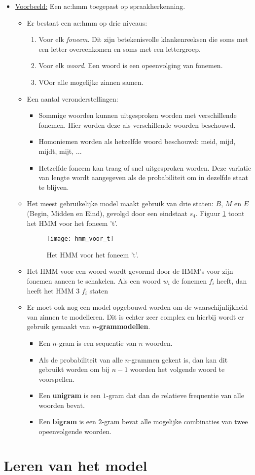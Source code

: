 \begin{itemize}
	\item \underline{Voorbeeld:} Een \gls{ac:hmm} toegepast op spraakherkenning.
	\begin{itemize}
		\item Er bestaat een \gls{ac:hmm} op drie niveaus:
		\begin{enumerate}
			\item Voor elk \textit{foneem}. Dit zijn betekenisvolle klankenreeksen die soms met een letter overeenkomen en soms met een lettergroep.
			\item Voor elk \textit{woord}. Een woord is een opeenvolging van fonemen. 
			\item VOor alle mogelijke zinnen samen.
		\end{enumerate}
		\item Een aantal veronderstellingen:
		\begin{itemize}
			\item Sommige woorden kunnen uitgesproken worden met verschillende fonemen. Hier worden deze als verschillende woorden beschouwd.
			\item Homoniemen worden als hetzelfde woord beschouwd: meid, mijd, mijdt, mijt, ...
			\item Hetzelfde foneem kan traag of snel uitgesproken worden. Deze variatie van lengte wordt aangegeven als de probabiliteit om in dezelfde staat te blijven.
		\end{itemize}
		\item Het meest gebruikelijke model maakt gebruik van drie staten: $B$, $M$ en $E$ (Begin, Midden en Eind), gevolgd door een eindstaat $s_4$. Figuur \ref{fig:hmm_voor_t} toont het HMM voor het foneem 't'.
		\begin{figure}
			\texttt{[image: hmm\_voor\_t]}
			\caption{Het HMM voor het foneem 't'.}
			\label{fig:hmm_voor_t}
		\end{figure}
	
		\item Het HMM voor een woord wordt gevormd door de HMM's voor zijn fonemen aaneen te schakelen. Als een woord $w_i$ de fonemen $f_i$ heeft, dan heeft het HMM 3 $f_i$ staten
		\item Er moet ook nog een model opgebouwd worden om de waarschijnlijkheid van zinnen te modelleren. Dit is echter zeer complex en hierbij wordt er gebruik gemaakt van \textbf{$n$-grammodellen}.
		\begin{itemize}
			\item Een $n$-gram is een sequentie van $n$ woorden.
			\item Als de probabiliteit van alle $n$-grammen gekent is, dan kan dit gebruikt worden om bij $n-1$ woorden het volgende woord te voorspellen.
			\item Een \textbf{unigram} is een $1$-gram dat dan de relatieve frequentie van alle woorden bevat.
			\item Een \textbf{bigram} is een $2$-gram bevat alle mogelijke combinaties van twee opeenvolgende woorden.
		\end{itemize}
	\end{itemize}
	
	

\end{itemize}

\section{Leren van het model}
